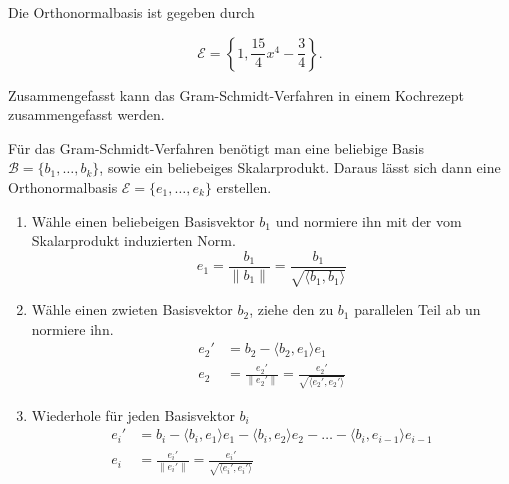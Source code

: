 Die Orthonormalbasis ist gegeben durch 

\begin{equation*}
    \mathcal{E} = \left\{ 1, \frac{15}{4}x^4 - \frac{3}{4} \right\}.
\end{equation*}

Zusammengefasst kann das Gram-Schmidt-Verfahren in einem Kochrezept zusammengefasst werden.

\begin{tcolorbox}[colback=gray!30, colframe=gray!80, title=Gram-Schmidt-Verfahren]
    Für das Gram-Schmidt-Verfahren benötigt man eine beliebige Basis \( \mathcal{B} = \{ b_1, \ldots, b_k \} \), sowie ein beliebeiges Skalarprodukt. Daraus lässt sich dann eine Orthonormalbasis \( \mathcal{E} = \{ e_1, \ldots, e_k \} \) erstellen.
    \begin{enumerate}
        \item Wähle einen beliebeigen Basisvektor \( b_1 \) und normiere ihn mit der vom Skalarprodukt induzierten Norm.
        \begin{equation*}
            e_1 = \frac{b_1}{\| b_1 \|} = \frac{b_1}{\sqrt{\langle b_1, b_1 \rangle}}
        \end{equation*}
        \item Wähle einen zwieten Basisvektor \( b_2 \), ziehe den zu \( b_1 \) parallelen Teil ab un normiere ihn.
        \begin{equation*}
            \begin{aligned}
                e_2' &= b_2 - \langle b_2, e_1 \rangle e_1 \\[1em]
                e_2 &= \frac{e_2'}{\| e_2' \|} = \frac{e_2'}{\sqrt{\langle e_2', e_2' \rangle}}
            \end{aligned}
        \end{equation*}
        \item Wiederhole für jeden Basisvektor \( b_i \)
        \begin{equation*}
            \begin{aligned}
                e_i' &= b_i - \langle b_i, e_1 \rangle e_1 - \langle b_i, e_2 \rangle e_2 - \ldots - \langle b_i, e_{i-1} \rangle e_{i-1} \\[1em]
                e_i &= \frac{e_i'}{\| e_i' \|} = \frac{e_i'}{\sqrt{\langle e_i', e_i' \rangle}}
            \end{aligned}
        \end{equation*}
    \end{enumerate}
\end{tcolorbox}
